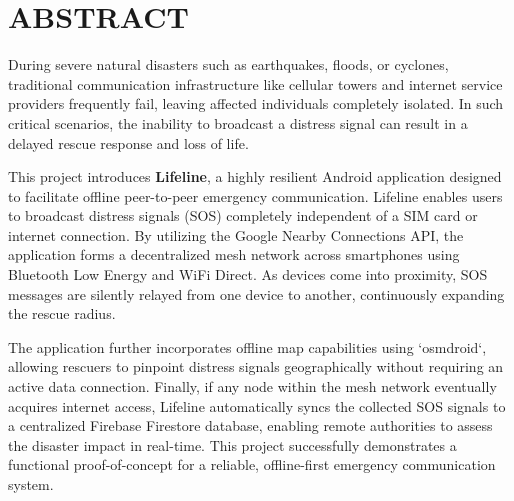 \chapter*{ABSTRACT}

During severe natural disasters such as earthquakes, floods, or cyclones, traditional communication infrastructure like cellular towers and internet service providers frequently fail, leaving affected individuals completely isolated. In such critical scenarios, the inability to broadcast a distress signal can result in a delayed rescue response and loss of life. 

This project introduces \textbf{Lifeline}, a highly resilient Android application designed to facilitate offline peer-to-peer emergency communication. Lifeline enables users to broadcast distress signals (SOS) completely independent of a SIM card or internet connection. By utilizing the Google Nearby Connections API, the application forms a decentralized mesh network across smartphones using Bluetooth Low Energy and WiFi Direct. As devices come into proximity, SOS messages are silently relayed from one device to another, continuously expanding the rescue radius. 

The application further incorporates offline map capabilities using `osmdroid`, allowing rescuers to pinpoint distress signals geographically without requiring an active data connection. Finally, if any node within the mesh network eventually acquires internet access, Lifeline automatically syncs the collected SOS signals to a centralized Firebase Firestore database, enabling remote authorities to assess the disaster impact in real-time. This project successfully demonstrates a functional proof-of-concept for a reliable, offline-first emergency communication system.

\cleardoublepage
